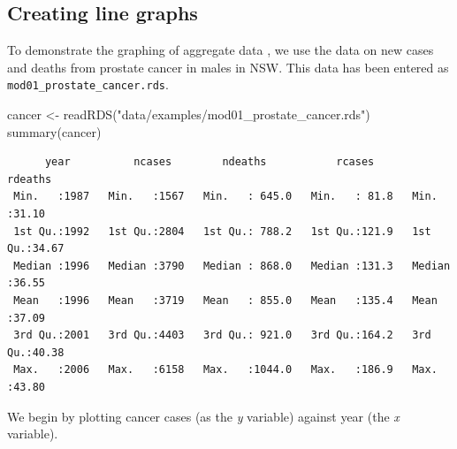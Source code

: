 \documentclass[
  a4paper,
]{memoir}
\newenvironment{Shaded}{\begin{snugshade}}{\end{snugshade}}
\newcommand{\AttributeTok}[1]{\textcolor[rgb]{0.00,0.00,0.00}{#1}}
\newcommand{\FunctionTok}[1]{\textcolor[rgb]{0.00,0.00,0.00}{#1}}
\newcommand{\NormalTok}[1]{\textcolor[rgb]{0.00,0.00,0.00}{#1}}
\newcommand{\OtherTok}[1]{\textcolor[rgb]{0.00,0.00,0.00}{#1}}
\newcommand{\SpecialCharTok}[1]{\textcolor[rgb]{0.00,0.00,0.00}{#1}}
\newcommand{\StringTok}[1]{\textcolor[rgb]{0.00,0.00,0.00}{#1}}
\begin{document}
\hypertarget{creating-line-graphs-1}{%
\subsection{Creating line graphs}\label{creating-line-graphs-1}}

To demonstrate the graphing of aggregate data , we use the data on new
cases and deaths from prostate cancer in males in NSW. This data has
been entered as \texttt{mod01\_prostate\_cancer.rds}.

\begin{Shaded}
\begin{Highlighting}[]
\NormalTok{cancer }\OtherTok{\textless{}{-}} \FunctionTok{readRDS}\NormalTok{(}\StringTok{"data/examples/mod01\_prostate\_cancer.rds"}\NormalTok{)}
\FunctionTok{summary}\NormalTok{(cancer)}
\end{Highlighting}
\end{Shaded}

\begin{verbatim}
      year          ncases        ndeaths           rcases         rdeaths     
 Min.   :1987   Min.   :1567   Min.   : 645.0   Min.   : 81.8   Min.   :31.10  
 1st Qu.:1992   1st Qu.:2804   1st Qu.: 788.2   1st Qu.:121.9   1st Qu.:34.67  
 Median :1996   Median :3790   Median : 868.0   Median :131.3   Median :36.55  
 Mean   :1996   Mean   :3719   Mean   : 855.0   Mean   :135.4   Mean   :37.09  
 3rd Qu.:2001   3rd Qu.:4403   3rd Qu.: 921.0   3rd Qu.:164.2   3rd Qu.:40.38  
 Max.   :2006   Max.   :6158   Max.   :1044.0   Max.   :186.9   Max.   :43.80  
\end{verbatim}

We begin by plotting cancer cases (as the \emph{y} variable) against
year (the \emph{x} variable).

\begin{Shaded}
\end{Shaded}
\end{document}
